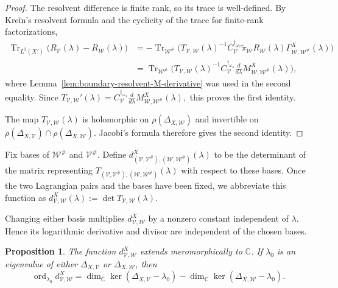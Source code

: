 \documentclass[12pt]{amsart}
\theoremstyle{plain}
\newtheorem{prop}[thm]{Proposition}
\theoremstyle{definition}
\theoremstyle{remark}
\numberwithin{equation}{section} \numberwithin{figure}{section}
\newcommand{\mb}[1]{\mathbb{#1}} %
\begin{document}
\begin{proof}
The resolvent difference is finite rank, so its trace is
well-defined. By Kreĭn's resolvent formula and the cyclicity of the
trace for finite-rank factorizations,
\[
\begin{aligned}
\operatorname{Tr}_{L^2(X')}
\bigl(R_{\mathcal V}(\lambda)-R_{\mathcal W}(\lambda)\bigr)
&=
-\operatorname{Tr}_{\mathcal W^\#}\bigl(
T_{\mathcal V,\mathcal W}(\lambda)^{-1}
C_{\mathcal V}^{\dagger_{\omega_S}}
\widetilde{\pi}_{\mathcal W}
R_{\mathcal W}(\lambda)
\Gamma_{\mathcal W,\mathcal W^\#}^{X}(\lambda)
\bigr) \\
&=
\operatorname{Tr}_{\mathcal W^\#}\bigl(
T_{\mathcal V,\mathcal W}(\lambda)^{-1}
C_{\mathcal V}^{\dagger_{\omega_S}}
\frac{d}{d\lambda}
M_{\mathcal W,\mathcal W^\#}^{X}(\lambda)
\bigr),
\end{aligned}
\]
where Lemma~\ref{lem:boundary-resolvent-M-derivative} was used in
the second equality. Since
\(
T_{\mathcal V,\mathcal W}'(\lambda)
=
C_{\mathcal V}^{\dagger_{\omega_S}}
\frac{d}{d\lambda}
M_{\mathcal W,\mathcal W^\#}^{X}(\lambda),
\)
this proves the first identity.

The map \(T_{\mathcal V,\mathcal W}(\lambda)\) is holomorphic on
\(\rho(\Delta_{X,\mathcal W})\) and invertible on
\(\rho(\Delta_{X,\mathcal V})
\cap\rho(\Delta_{X,\mathcal W})\).
Jacobi's formula therefore gives the second identity.
\end{proof}
Fix bases of \(\mathcal W^\#\) and \(\mathcal V^\#\). Define
\(d_{(\mathcal V,\mathcal V^\#),(\mathcal W,\mathcal W^\#)}^{X}
(\lambda)\) to be the determinant of the matrix representing
\(T_{(\mathcal V,\mathcal V^\#),(\mathcal W,\mathcal W^\#)}
(\lambda)\) with respect to these bases. Once the two Lagrangian
pairs and the bases have been fixed, we abbreviate this function as
\(
d_{\mathcal V,\mathcal W}^{X}(\lambda)
:=
\det T_{\mathcal V,\mathcal W}(\lambda).
\)

Changing either basis multiplies
\(d_{\mathcal V,\mathcal W}^{X}\) by a nonzero constant independent
of \(\lambda\). Hence its logarithmic derivative and divisor are
independent of the chosen bases.

\begin{prop}\label{prop:order-of-determinant-function}
The function \(d_{\mathcal V,\mathcal W}^{X}\) extends
meromorphically to \(\mb C\). If \(\lambda_0\) is an eigenvalue of
either \(\Delta_{X,\mathcal V}\) or
\(\Delta_{X,\mathcal W}\), then
\[
\operatorname{ord}_{\lambda_0}
d_{\mathcal V,\mathcal W}^{X}
=
\dim_{\mb C}\ker(\Delta_{X,\mathcal V}-\lambda_0)
-
\dim_{\mb C}\ker(\Delta_{X,\mathcal W}-\lambda_0).
\]
\end{prop}
\end{document}
